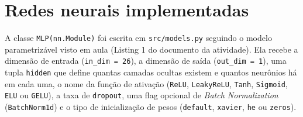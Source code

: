 \documentclass[12pt,a4paper]{article}
\begin{document}
\begin{table}[htbp]
\centering
\caption{Especificações do computador e das bibliotecas utilizadas nos experimentos}
\label{tab:hardware}
\footnotesize
{}
\end{table}

\section{Redes neurais implementadas}

A classe \texttt{MLP(nn.Module)} foi escrita em \texttt{src/models.py} seguindo o modelo parametrizável visto em aula (Listing 1 do documento da atividade). Ela recebe a dimensão de entrada (\texttt{in\_dim = 26}), a dimensão de saída (\texttt{out\_dim = 1}), uma tupla \texttt{hidden} que define quantas camadas ocultas existem e quantos neurônios há em cada uma, o nome da função de ativação (\texttt{ReLU}, \texttt{LeakyReLU}, \texttt{Tanh}, \texttt{Sigmoid}, \texttt{ELU} ou \texttt{GELU}), a taxa de \texttt{dropout}, uma flag opcional de \textit{Batch Normalization} (\texttt{BatchNorm1d}) e o tipo de inicialização de pesos (\texttt{default}, \texttt{xavier}, \texttt{he} ou \texttt{zeros}).
\end{document}
